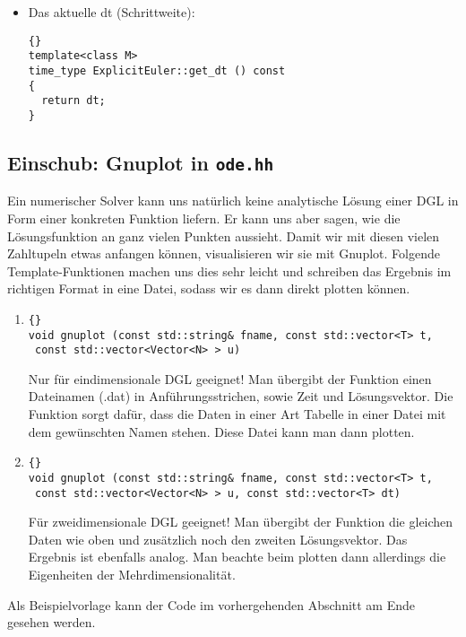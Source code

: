 \documentclass[a4paper,11pt]{article}
\theoremstyle{definition}
\begin{document}
\begin{itemize}
\item Das aktuelle dt (Schrittweite):
{\footnotesize{\begin{lstlisting}{}
template<class M>
time_type ExplicitEuler::get_dt () const
{
  return dt;
}
\end{lstlisting}}}
\end{itemize}

\subsection{Einschub: Gnuplot in \lstinline{ode.hh}}
Ein numerischer Solver kann uns natürlich keine analytische Lösung
einer DGL in Form einer konkreten Funktion liefern. Er kann uns aber
sagen, wie die Lösungsfunktion an ganz vielen Punkten aussieht. Damit
wir mit diesen vielen Zahltupeln etwas anfangen können, visualisieren
wir sie mit Gnuplot.  Folgende Template-Funktionen machen uns dies
sehr leicht und schreiben das Ergebnis im richtigen Format in eine
Datei, sodass wir es dann direkt plotten können.

\begin{enumerate}
\item
{\footnotesize{\begin{lstlisting}{}
void gnuplot (const std::string& fname, const std::vector<T> t,
 const std::vector<Vector<N> > u)
\end{lstlisting}}}

Nur für eindimensionale DGL geeignet!  Man übergibt der Funktion einen
Dateinamen (.dat) in Anführungsstrichen, sowie Zeit und
Lösungsvektor. Die Funktion sorgt dafür, dass die Daten in einer Art
Tabelle in einer Datei mit dem gewünschten Namen stehen. Diese Datei
kann man dann plotten.
\item
{\footnotesize{\begin{lstlisting}{}
void gnuplot (const std::string& fname, const std::vector<T> t,
 const std::vector<Vector<N> > u, const std::vector<T> dt)
\end{lstlisting}}}

Für zweidimensionale DGL geeignet!  Man übergibt der Funktion die
gleichen Daten wie oben und zusätzlich noch den zweiten
Lösungsvektor. Das Ergebnis ist ebenfalls analog. Man beachte beim
plotten dann allerdings die Eigenheiten der Mehrdimensionalität.
\end{enumerate}

Als Beispielvorlage kann der Code im vorhergehenden Abschnitt am Ende
gesehen werden.
\end{document}
